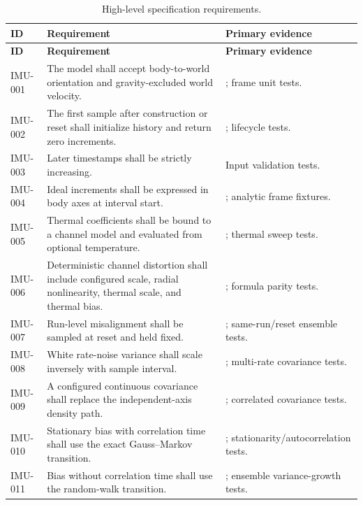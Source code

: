 \documentclass[11pt,oneside,headings=big]{scrreprt}
\begin{document}
    \begin{longtable}{@{}L{0.75in}L{2.45in}L{3.05in}@{}}
        \caption{High-level specification requirements.}
        \label{tab:requirements}\\
        \toprule
        \textbf{ID} & \textbf{Requirement} & \textbf{Primary evidence} \\
        \midrule
        \endfirsthead
        \toprule
        \textbf{ID} & \textbf{Requirement} & \textbf{Primary evidence} \\
        \midrule
        \endhead
        IMU-001 & The model shall accept body-to-world orientation and gravity-excluded world velocity. & ; frame unit tests. \\
        IMU-002 & The first sample after construction or reset shall initialize history and return zero increments. & ; lifecycle tests. \\
        IMU-003 & Later timestamps shall be strictly increasing. & Input validation tests. \\
        IMU-004 & Ideal increments shall be expressed in body axes at interval start. & ; analytic frame fixtures. \\
        IMU-005 & Thermal coefficients shall be bound to a channel model and evaluated from optional temperature. & ; thermal sweep tests. \\
        IMU-006 & Deterministic channel distortion shall include configured scale, radial nonlinearity, thermal scale, and thermal bias. & ; formula parity tests. \\
        IMU-007 & Run-level misalignment shall be sampled at reset and held fixed. & ; same-run/reset ensemble tests. \\
        IMU-008 & White rate-noise variance shall scale inversely with sample interval. & ; multi-rate covariance tests. \\
        IMU-009 & A configured continuous covariance shall replace the independent-axis density path. & ; correlated covariance tests. \\
        IMU-010 & Stationary bias with correlation time shall use the exact Gauss--Markov transition. & ; stationarity/autocorrelation tests. \\
        IMU-011 & Bias without correlation time shall use the random-walk transition. & ; ensemble variance-growth tests. \\

\end{longtable}
\end{document}
